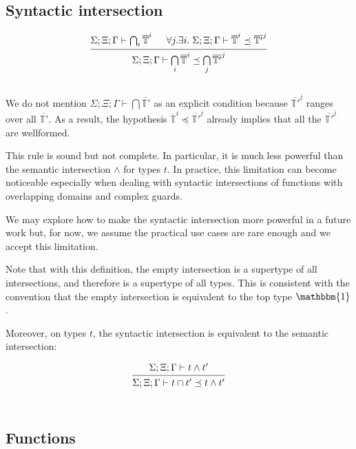 \documentclass[12pt]{article}
\newcommand{\Gammatop}{\ensuremath{\Xi}}
\newcommand{\Gammabot}{\ensuremath{\Gamma}}
\newcommand{\toptype}{\mathbbm{1}}
\begin{document}
\subsection{Syntactic intersection}

\[
    \begin{prooftree}
        \hypo{ \Sigma; \Gammatop; \Gammabot \vdash \bigcap_i \overline{\mathbb{T}}^i }
        \hypo{ \forall j. \exists i. \; \Sigma; \Gammatop; \Gammabot \vdash \overline{\mathbb{T}}^i \preceq \overline{\mathbb{T}'}^j }
        \infer2{ \Sigma; \Gammatop; \Gammabot \vdash \bigcap\limits_i \overline{\mathbb{T}}^i \preceq \bigcap\limits_j \overline{\mathbb{T}'}^j}
    \end{prooftree}
\] \\

We do not mention $\Sigma; \Gammatop; \Gammabot \vdash \bigcap \overline{\mathbb{T}'}$
as an explicit condition because $\overline{\mathbb{T}'}^j$ ranges over all $\overline{\mathbb{T}'}$.
As a result, the hypothesis $\overline{\mathbb{T}}^i \preceq \overline{\mathbb{T}'}^j$ already implies that
all the $\overline{\mathbb{T}'}^j$ are wellformed.

This rule is sound but not complete. In particular, it is much less powerful than
the semantic intersection $\wedge$ for types $t$.
In practice, this limitation can become noticeable especially when dealing with syntactic
intersections of functions with overlapping domains and complex guards.

We may explore how to make the syntactic
intersection more powerful in a future work
but, for now, we assume the practical use cases are
rare enough and we accept this limitation.

Note that with this definition, the empty intersection is a supertype of all intersections,
and therefore is a supertype of all types. This is consistent with the convention that
the empty intersection is equivalent to the top type $\toptype$.

Moreover, on types $t$, the syntactic intersection is equivalent to the semantic intersection:

\[
    \begin{prooftree}
        \hypo{ \Sigma; \Gammatop; \Gammabot \vdash t \wedge t'}
        \infer1{ \Sigma; \Gammatop; \Gammabot \vdash t \cap t' \preceq t \wedge t' }
    \end{prooftree}
\] \\

\subsection{Functions}
\end{document}
